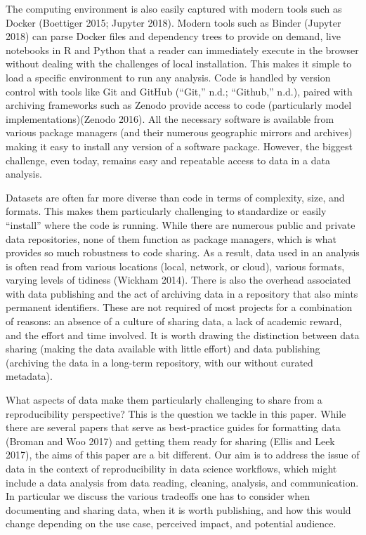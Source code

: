 \documentclass[
]{article}
\begin{document}
The computing environment is also easily captured with modern tools such as Docker (Boettiger 2015; Jupyter 2018). Modern tools such as Binder (Jupyter 2018) can parse Docker files and dependency trees to provide on demand, live notebooks in R and Python that a reader can immediately execute in the browser without dealing with the challenges of local installation. This makes it simple to load a specific environment to run any analysis. Code is handled by version control with tools like Git and GitHub (``Git,'' n.d.; ``Github,'' n.d.), paired with archiving frameworks such as Zenodo provide access to code (particularly model implementations)(Zenodo 2016). All the necessary software is available from various package managers (and their numerous geographic mirrors and archives) making it easy to install any version of a software package. However, the biggest challenge, even today, remains easy and repeatable access to data in a data analysis.

Datasets are often far more diverse than code in terms of complexity, size, and formats. This makes them particularly challenging to standardize or easily ``install'' where the code is running. While there are numerous public and private data repositories, none of them function as package managers, which is what provides so much robustness to code sharing. As a result, data used in an analysis is often read from various locations (local, network, or cloud), various formats, varying levels of tidiness (Wickham 2014). There is also the overhead associated with data publishing and the act of archiving data in a repository that also mints permanent identifiers. These are not required of most projects for a combination of reasons: an absence of a culture of sharing data, a lack of academic reward, and the effort and time involved. It is worth drawing the distinction between data sharing (making the data available with little effort) and data publishing (archiving the data in a long-term repository, with our without curated metadata).

What aspects of data make them particularly challenging to share from a reproducibility perspective? This is the question we tackle in this paper. While there are several papers that serve as best-practice guides for formatting data (Broman and Woo 2017) and getting them ready for sharing (Ellis and Leek 2017), the aims of this paper are a bit different. Our aim is to address the issue of data in the context of reproducibility in data science workflows, which might include a data analysis from data reading, cleaning, analysis, and communication. In particular we discuss the various tradeoffs one has to consider when documenting and sharing data, when it is worth publishing, and how this would change depending on the use case, perceived impact, and potential audience.
\end{document}
